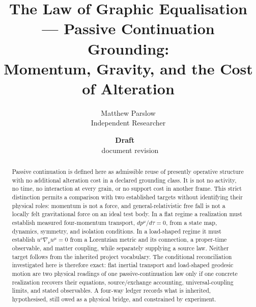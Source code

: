 \documentclass[11pt,a4paper]{article}
\title{The Law of Graphic Equalisation --- Passive Continuation Grounding:\\
\large Momentum, Gravity, and the Cost of Alteration}
\author{Matthew Parslow\\Independent Researcher}
\date{\textbf{Draft \texorpdfstring{\textemdash}{---}\ \PaperDraft}\\[2pt]\PaperDisplayDate \texorpdfstring{\textbullet}{\textperiodcentered}\ document revision \PaperRevision}
\theoremstyle{remark}
\begin{document}
\maketitle
\begin{center}
\end{center}
\vspace{1em}

\begin{abstract}
Passive continuation is defined here as admissible reuse of presently operative
structure with no additional alteration cost in a declared grounding class. It
is not no activity, no time, no interaction at every grain, or no support cost
in another frame. This strict distinction permits a comparison with two
established targets without identifying their physical roles: momentum is not a
force, and general-relativistic free fall is not a locally felt gravitational
force on an ideal test body. In a flat regime a realization must establish
measured four-momentum transport, $dp^\mu/d\tau=0$, from a state map,
dynamics, symmetry, and isolation conditions. In a load-shaped regime it must
establish $u^\nu\nabla_\nu u^\mu=0$ from a Lorentzian metric and its
connection, a proper-time observable, and matter coupling, while separately supplying a
source law. Neither target follows from the inherited project vocabulary. The
conditional reconciliation investigated here is therefore exact: flat inertial
transport and load-shaped geodesic motion are two physical readings of one
passive-continuation law only if one concrete realization recovers their
equations, source/exchange accounting, universal-coupling limits, and stated
observables. A four-way ledger records what is inherited, hypothesised, still
owed as a physical bridge, and constrained by experiment.
\end{abstract}
\end{document}
